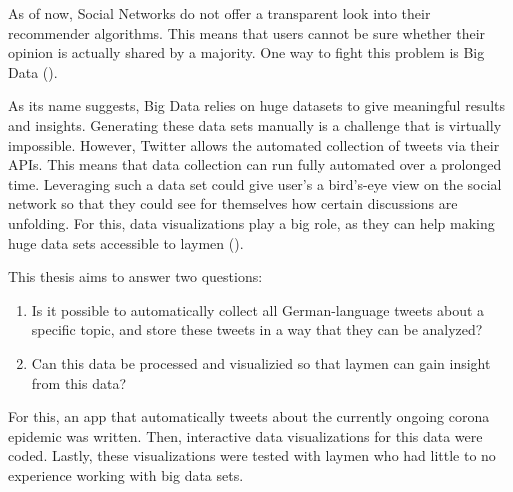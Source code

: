 As of now, Social Networks do not offer a transparent look into their recommender algorithms. This means that users cannot be sure whether their opinion is actually shared by a majority. One way to fight this problem is Big Data (\cite{crawfordCriticalQuestionsBig2012}).

As its name suggests, Big Data relies on huge datasets to give meaningful results and insights. Generating these data sets manually is a challenge that is virtually impossible. However, Twitter allows the automated collection of tweets via their APIs. This means that data collection can run fully automated over a prolonged time. Leveraging such a data set could give user's a bird's-eye view on the social network so that they could see for themselves how certain discussions are unfolding. For this, data visualizations play a big role, as they can help making huge data sets accessible to laymen (\cite{donalekImmersiveCollaborativeData2014}).

This thesis aims to answer two questions:

\begin{enumerate}
    \item Is it possible to automatically collect all German-language tweets about a specific topic, and store these tweets in a way that they can be analyzed?
    \item Can this data be processed and visualizied so that laymen can gain insight from this data?
\end{enumerate}

For this, an app that automatically tweets about the currently ongoing corona epidemic was written. Then, interactive data visualizations for this data were coded. Lastly, these visualizations were tested with laymen who had little to no experience working with big data sets.
